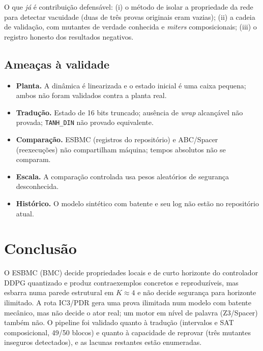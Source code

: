 \documentclass[12pt,openright,oneside,a4paper,chapter=TITLE,sumario=tradicional,english,brazil]{abntex2}
\begin{document}
O que \emph{já} é contribuição defensável: (i) o método de isolar a propriedade da rede para detectar vacuidade (duas de três provas originais eram vazias); (ii) a cadeia de validação, com mutantes de verdade conhecida e \emph{miters} composicionais; (iii) o registro honesto dos resultados negativos.

\section{Ameaças à validade}

\begin{itemize}
  \item \textbf{Planta.} A dinâmica é linearizada e o estado inicial é uma caixa pequena; ambos não foram validados contra a planta real.
  \item \textbf{Tradução.} Estado de 16 bits truncado; ausência de \emph{wrap} alcançável não provada; \texttt{TANH\_DIN} não provado equivalente.
  \item \textbf{Comparação.} ESBMC (registros do repositório) e ABC/Spacer (reexecuções) não compartilham máquina; tempos absolutos não se comparam.
  \item \textbf{Escala.} A comparação controlada usa pesos aleatórios de segurança desconhecida.
  \item \textbf{Histórico.} O modelo sintético com batente e seu log não estão no repositório atual.
\end{itemize}

\chapter{Conclusão}\label{cap:concl}

O ESBMC (BMC) decide propriedades locais e de curto horizonte do controlador DDPG quantizado e produz contraexemplos concretos e reproduzíveis, mas esbarra numa parede estrutural em $K\approx4$ e não decide segurança para horizonte ilimitado. A rota IC3/PDR gera uma prova ilimitada num modelo com batente mecânico, mas não decide o ator real; um motor em nível de palavra (Z3/Spacer) também não. O pipeline foi validado quanto à tradução (intervalos e SAT composicional, 49/50 blocos) e quanto à capacidade de reprovar (três mutantes inseguros detectados), e as lacunas restantes estão enumeradas.
\end{document}
